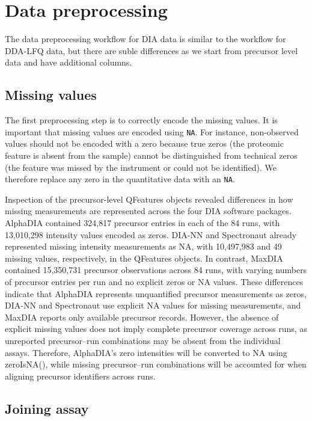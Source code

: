 \documentclass[
  10pt,
]{article}
\begin{document}
\section{Data preprocessing}\label{data-preprocessing}

The data preprocessing workflow for DIA data is similar to the workflow
for DDA-LFQ data, but there are suble differences as we start from
precursor level data and have additional columns.

\subsection{Missing values}\label{missing-values}

The first preprocessing step is to correctly encode the missing values.
It is important that missing values are encoded using \texttt{NA}. For
instance, non-observed values should not be encoded with a zero because
true zeros (the proteomic feature is absent from the sample) cannot be
distinguished from technical zeros (the feature was missed by the
instrument or could not be identified). We therefore replace any zero in
the quantitative data with an \texttt{NA}.

Inspection of the precursor-level QFeatures objects revealed differences
in how missing measurements are represented across the four DIA software
packages. AlphaDIA contained 324,817 precursor entries in each of the 84
runs, with 13,010,298 intensity values encoded as zeros. DIA-NN and
Spectronaut already represented missing intensity measurements as NA,
with 10,497,983 and 49 missing values, respectively, in the QFeatures
objects. In contrast, MaxDIA contained 15,350,731 precursor observations
across 84 runs, with varying numbers of precursor entries per run and no
explicit zeros or NA values. These differences indicate that AlphaDIA
represents unquantified precursor measurements as zeros, DIA-NN and
Spectronaut use explicit NA values for missing measurements, and MaxDIA
reports only available precursor records. However, the absence of
explicit missing values does not imply complete precursor coverage
across runs, as unreported precursor--run combinations may be absent
from the individual assays. Therefore, AlphaDIA's zero intensities will
be converted to NA using zeroIsNA(), while missing precursor--run
combinations will be accounted for when aligning precursor identifiers
across runs.

\subsection{Joining assay}\label{joining-assay}
\end{document}
